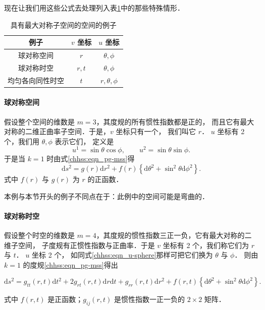 现在让我们用这些公式去处理列入表\ref{chhss:tab-msss}中的那些特殊情形．

\begin{table}[htb]
    \centering
    \caption{具有最大对称子空间的空间的例子} \label{chhss:tab-msss}
    \begin{tabular}{c|c|c}
        \hline 例子 & $v$ 坐标 & $u$ 坐标 \\
        \hline 球对称空间 & $r$ & $\theta, \phi$ \\
        球对称时空 & $r, t$ & $\theta, \phi$ \\
        均匀各向同性时空 & $t$ & $r, \theta, \phi$ \\
        \hline
    \end{tabular}
\end{table}


\paragraph{球对称空间}
假设整个空间的维数是 $m=3$，其度规的所有惯性指数都是正的，
而且它有最大对称的二维正曲率子空间．于是，$v$ 坐标只有一个， 我们叫它 $r$．
$u$ 坐标有 2 个，我们用 $\theta, \phi$ 表示它们， 定义是
\begin{equation}\label{chhss:eqn_u-sphere}
    u^1=\sin \theta \cos \phi, \qquad u^2=\sin \theta \sin \phi .
\end{equation}
于是当 $k=1$ 时由式\eqref{chhss:eqn_pg-mss}得
\begin{equation}\label{chhss_eqn_g-sphere}
    \mathrm{d} s^2=g(r) \mathrm{d} r^2+f(r)\left\{\mathrm{d} \theta^2+\sin ^2 \theta \mathrm{d} \phi^2\right\} .
\end{equation}
式中 $f(r)$ 与 $g(r)$ 为 $r$ 的正函数．

本例与本节开头的例子不同点在于：此例中的空间可能是弯曲的．



\paragraph{球对称时空}
假设整个时空的维数是 $m=4$，其度规的惯性指数三正一负，它有最大对称的二维子空间，
子度规有正惯性指数与正曲率．于是 $v$ 坐标有 2 个，我们称它们为 $r$ 与 $t$．
$u$ 坐标 2 个， 如同式\eqref{chhss:eqn_u-sphere}那样可把它们换为 $\theta$ 与 $\phi$． 
则由 $k=1$ 的度规\eqref{chhss:eqn_pg-mss}得出
\begin{small}
\begin{equation}\label{chhss_eqn_g-st-sphere}
    \mathrm{d} s^2=  g_{t t}(r, t) \mathrm{d} t^2+2 g_{r t}(r, t) \mathrm{d} r \mathrm{d} t+g_{r r}(r, t) \mathrm{d} r^2 
     +f(r, t)\left\{\mathrm{d} \theta^2+\sin ^2 \theta \mathrm{d} \phi^2\right\} .
\end{equation}
\end{small}
式中 $f(r, t)$ 是正函数；$g_{i j}(r, t)$ 是惯性指数一正一负的 $2 \times 2$ 矩阵．

